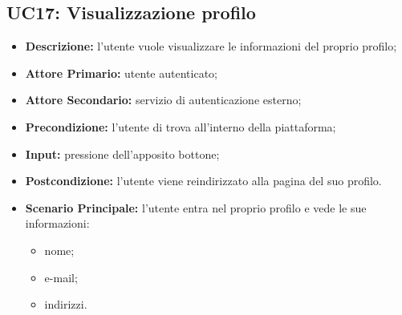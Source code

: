 \subsection{UC17: Visualizzazione profilo}
\label{sec:UC17}
\begin{itemize}
    \item \textbf{Descrizione:} l'utente vuole visualizzare le informazioni del proprio profilo;
    \item \textbf{Attore Primario:} utente autenticato;
    \item \textbf{Attore Secondario:} servizio di autenticazione esterno;
    \item \textbf{Precondizione:} l'utente di trova all'interno della piattaforma;
    \item \textbf{Input:} pressione dell'apposito bottone;
    \item \textbf{Postcondizione:} l'utente viene reindirizzato alla pagina del suo profilo.
    \item \textbf{Scenario Principale:} l'utente entra nel proprio profilo e vede le sue informazioni:
    \begin{itemize}
        \item nome;
        \item e-mail;
        \item indirizzi.
    \end{itemize}
\end{itemize}